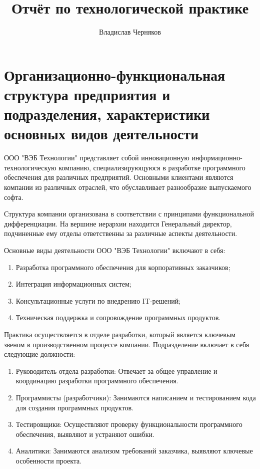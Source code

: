 \documentclass[12pt,a4paper,draft]{belgost/belgost}
\title{Отчёт по технологической практике}
\author{Владислав Черняков}
\begin{document}
\maketitle

\tableofcontents

\chapter{Организационно-функциональная структура предприятия и подразделения, характеристики основных видов деятельности}

ООО "ВЭБ Технологии" представляет собой инновационную информационно-технологическую компанию, специализирующуюся в разработке программного обеспечения для различных предприятий.
Основными клиентами являются компании из различных отраслей, что обуславливает разнообразие выпускаемого софта.

Структура компании организована в соответствии с принципами функциональной дифференциации.
На вершине иерархии находится Генеральный директор, подчиненные ему отделы ответственны за различные аспекты деятельности.

Основные виды деятельности ООО "ВЭБ Технологии" включают в себя:
\begin{enumerate}
    \item Разработка программного обеспечения для корпоративных заказчиков;
    \item Интеграция информационных систем;
    \item Консультационные услуги по внедрению IT-решений;
    \item Техническая поддержка и сопровождение программных продуктов.
\end{enumerate}

Практика осуществляется в отделе разработки, который является ключевым звеном в производственном процессе компании.
Подразделение включает в себя следующие должности:
\begin{enumerate}
    \item Руководитель отдела разработки: Отвечает за общее управление и координацию разработки программного обеспечения.
    \item Программисты (разработчики): Занимаются написанием и тестированием кода для создания программных продуктов.
    \item Тестировщики: Осуществляют проверку функциональности программного обеспечения, выявляют и устраняют ошибки.
    \item Аналитики: Занимаются анализом требований заказчика, выявляют ключевые особенности проекта.
\end{enumerate}
\end{document}
